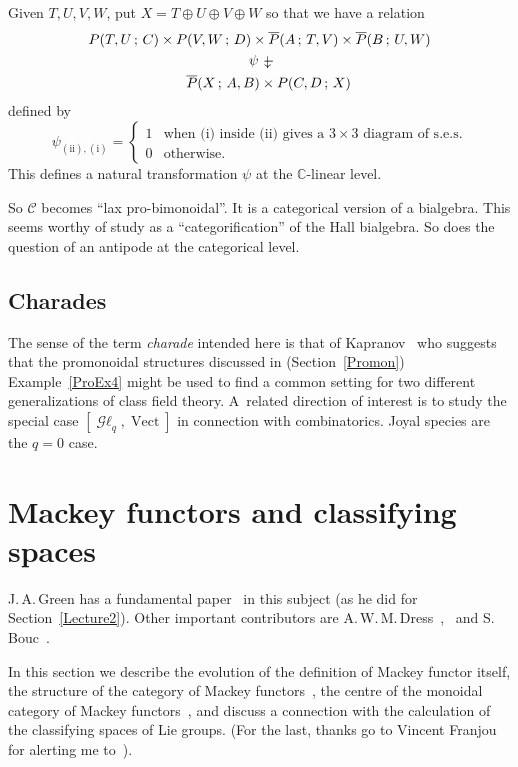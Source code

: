 \documentclass[a4paper,12pt]{article}
\theoremstyle{definition}
\theoremstyle{fact}
\theoremstyle{genquest}
\theoremstyle{step}
\newcommand{\catC}{\mathcal{C}}
\newcommand{\CC}{\mathbb{C}}
\newcommand{\catGL}{\mathop{\mathcal{G}\ell}\nolimits}
\newcommand{\Vect}{\operatorname{Vect}}
\begin{document}
\noindent
Given $T,U,V,W$, put $X = T \oplus U  \oplus  V  \oplus  W$ so that we have a relation
\begin{eqnarray*}
P(T,U\,;\,C) \times P(V,W\,;\,D)   \times  \overline P (A\,;\,T,V) \times \overline P (B\,;\,U,W)
\\
 \psi \ {-\hspace{-2.5mm}\raisebox{-0.3mm}{$\downarrow$}}  \hspace{40mm}
\\
\overline P (X\,;\,A,B)  \times P(C,D\,;\,X)   \hspace{20mm}
\end{eqnarray*}
defined by
\[
\psi_{\mathrm{(ii),(i)}} =  \begin{cases}
1 & \text{when (i) inside (ii) gives a $3 \times 3$ diagram of s.e.s.}
\\
0 & \text{otherwise}.
\end{cases}
\]
This defines a natural transformation $\psi$ at the $\CC$-linear level.
 
 So $\catC$ becomes ``lax pro-bimonoidal''.   
 It is a categorical version of a bialgebra.   
 This seems worthy of study as a ``categorification'' of the Hall bialgebra.     
 So does the question of an antipode at the categorical level.
 
\subsection{Charades}
 
The sense of the term \emph{charade} intended here is that of Kapranov~\cite{Kapr1995} 
who suggests that the promonoidal structures discussed in (Section~\ref{Promon}) Example~\ref{ProEx4} 
might be used to find a common setting for two different generalizations of class field theory. 
A~related direction of interest is to study the special case $[\catGL_q, \Vect ]$ in connection with combinatorics.  
Joyal species are the $q=0$ case.
 

\section{Mackey functors and classifying spaces\label{Lecture3}} 

 J.\,A.\,Green has a fundamental paper~\cite{Green1971} in this subject (as he did for Section~\ref{Lecture2}). 
 Other important contributors are A.\,W.\,M.\,Dress~\cite{Dress1973},~\cite{Dress1975}  and S.\,Bouc~\cite{BoucBook}.

In this section we describe the evolution of the definition of Mackey functor itself, 
the structure of the category of Mackey functors~\cite{MFCCC}, 
the centre of the monoidal category of Mackey functors~\cite{Tambara2008}, 
and discuss a connection with the calculation of the classifying spaces of Lie groups. 
(For the last, thanks go to Vincent Franjou for alerting me to~\cite{JackMcC1992}).
\end{document}
